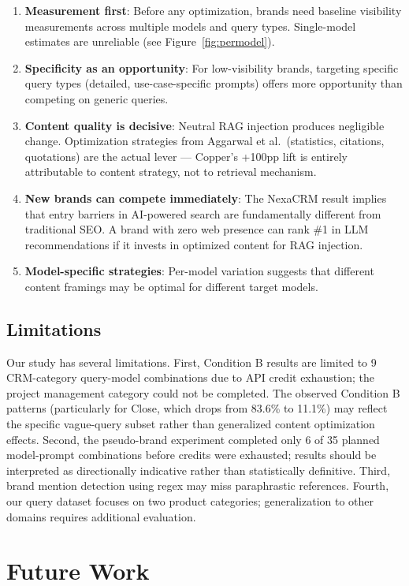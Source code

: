 \documentclass{article}
\begin{document}
\begin{enumerate}
  \item \textbf{Measurement first}: Before any optimization, brands need baseline visibility measurements across multiple models and query types. Single-model estimates are unreliable (see Figure~\ref{fig:permodel}).
  \item \textbf{Specificity as an opportunity}: For low-visibility brands, targeting specific query types (detailed, use-case-specific prompts) offers more opportunity than competing on generic queries.
  \item \textbf{Content quality is decisive}: Neutral RAG injection produces negligible change. Optimization strategies from Aggarwal et al.\ (statistics, citations, quotations) are the actual lever — Copper's +100pp lift is entirely attributable to content strategy, not to retrieval mechanism.
  \item \textbf{New brands can compete immediately}: The NexaCRM result implies that entry barriers in AI-powered search are fundamentally different from traditional SEO. A brand with zero web presence can rank \#1 in LLM recommendations if it invests in optimized content for RAG injection.
  \item \textbf{Model-specific strategies}: Per-model variation suggests that different content framings may be optimal for different target models.
\end{enumerate}

\subsection{Limitations}

Our study has several limitations. First, Condition B results are limited to 9 CRM-category query-model combinations due to API credit exhaustion; the project management category could not be completed. The observed Condition B patterns (particularly for Close, which drops from 83.6\% to 11.1\%) may reflect the specific vague-query subset rather than generalized content optimization effects. Second, the pseudo-brand experiment completed only 6 of 35 planned model-prompt combinations before credits were exhausted; results should be interpreted as directionally indicative rather than statistically definitive. Third, brand mention detection using regex may miss paraphrastic references. Fourth, our query dataset focuses on two product categories; generalization to other domains requires additional evaluation.

\section{Future Work}
\end{document}
